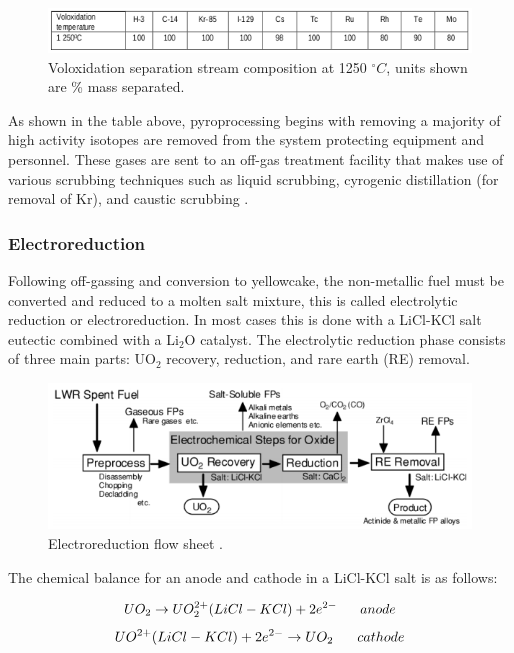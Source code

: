 \begin{figure}[h]
	\includegraphics[width=\linewidth]{images/volox_table.png}
	\caption{Voloxidation separation stream composition at 1250 $^\circ C$, units shown are \% mass separated.}
	\label{fig:volox}
\end{figure}

As shown in the table above, pyroprocessing begins with removing a majority of high activity isotopes are removed from the system protecting equipment and personnel. These gases are sent to an off-gas treatment facility that makes use of various scrubbing techniques such as liquid scrubbing, cyrogenic distillation (for removal of Kr), and caustic scrubbing \cite{jubin_spent_2009}.

\subsubsection{Electroreduction}
Following off-gassing and conversion to yellowcake, the non-metallic fuel must be converted and reduced to a molten salt mixture, this is called electrolytic reduction or electroreduction.
In most cases this is done with a LiCl-KCl salt eutectic combined with a Li$_2$O catalyst. The electrolytic reduction phase consists of three main parts: UO$_2$ recovery, reduction, and rare earth (RE) removal.

\begin{figure}[h]
	\centering
	\includegraphics[width=\linewidth]{images/reduction_flow}
	\caption{Electroreduction flow sheet \cite{ohta}.}
\end{figure}

The chemical balance for an anode and cathode in a LiCl-KCl salt is as follows:

\[ UO_2 \rightarrow UO_2^{2+}(LiCl-KCl) + 2e^{2-} \hspace{6mm} anode \]
\[ UO^{2+}(LiCl-KCl) + 2e^{2-} \rightarrow UO_2 \hspace{6mm} cathode \]

